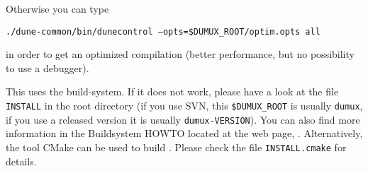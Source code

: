 Otherwise you can type
\begin{center}
\texttt{./dune-common/bin/dunecontrol --opts=\$DUMUX\_ROOT/optim.opts all}
\end{center}
in order to get an optimized compilation (better performance, but no possibility to use a debugger).

This uses the \Dune build-system. If it does not work, please have a look at the file \texttt{INSTALL} in the \Dumux root directory (if you use SVN, this \texttt{\$DUMUX\_ROOT} is usually \texttt{dumux}, if you use a released version it is usually \texttt{dumux-VERSION}). You can also find more information in the \Dune Buildsystem HOWTO located at the \Dune web page, \cite{DUNE-HP}.  Alternatively, the tool CMake can be used to build \Dumux. Please check the file \texttt{INSTALL.cmake} for details.
